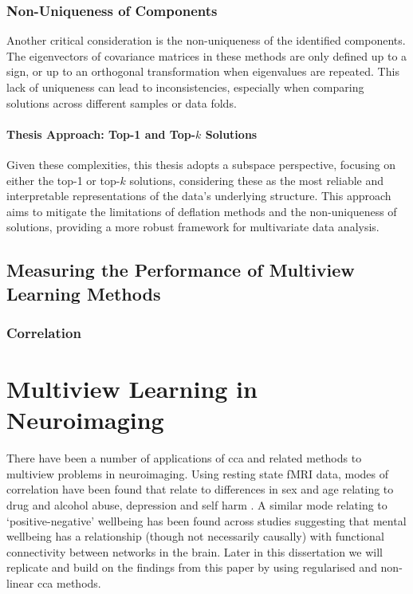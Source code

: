 \subsubsection{Non-Uniqueness of Components}

Another critical consideration is the non-uniqueness of the identified components.
The eigenvectors of covariance matrices in these methods are only defined up to a sign, or up to an orthogonal transformation when eigenvalues are repeated. This lack of uniqueness can lead to inconsistencies, especially when comparing solutions across different samples or data folds.

\paragraph{Thesis Approach: Top-1 and Top-$k$ Solutions}

Given these complexities, this thesis adopts a subspace perspective, focusing on either the top-1 or top-$k$ solutions, considering these as the most reliable and interpretable representations of the data's underlying structure.
This approach aims to mitigate the limitations of deflation methods and the non-uniqueness of solutions, providing a more robust framework for multivariate data analysis.

\subsection{Measuring the Performance of Multiview Learning Methods}

\subsubsection{Correlation}



\section{Multiview Learning in Neuroimaging}

There have been a number of applications of \acrshort{cca} and related methods to multiview problems in neuroimaging.
Using resting state fMRI data, modes of correlation have been found that relate to differences in sex and age relating to drug and alcohol abuse, depression and self harm \citep{mihalik2019brain}.
A similar mode relating to `positive-negative' wellbeing has been found across studies \citep{smith2015positive}suggesting that mental wellbeing has a relationship (though not necessarily causally) with functional connectivity between networks in the brain.
Later in this dissertation we will replicate and build on the findings from this paper by using regularised and non-linear \acrshort{cca} methods.

